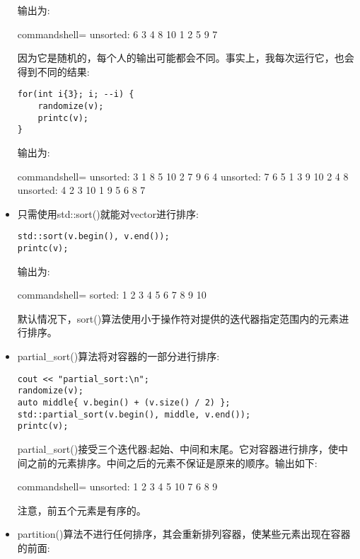 \begin{itemize}
输出为:

\begin{tcblisting}{commandshell={}}
unsorted: 6 3 4 8 10 1 2 5 9 7
\end{tcblisting}

因为它是随机的，每个人的输出可能都会不同。事实上，我每次运行它，也会得到不同的结果:

\begin{lstlisting}[style=styleCXX]
for(int i{3}; i; --i) {
	randomize(v);
	printc(v);
}
\end{lstlisting}

输出为:

\begin{tcblisting}{commandshell={}}
unsorted: 3 1 8 5 10 2 7 9 6 4
unsorted: 7 6 5 1 3 9 10 2 4 8
unsorted: 4 2 3 10 1 9 5 6 8 7
\end{tcblisting}

\item 
只需使用std::sort()就能对vector进行排序:

\begin{lstlisting}[style=styleCXX]
std::sort(v.begin(), v.end());
printc(v);
\end{lstlisting}

输出为:

\begin{tcblisting}{commandshell={}}
sorted: 1 2 3 4 5 6 7 8 9 10
\end{tcblisting}

默认情况下，sort()算法使用小于操作符对提供的迭代器指定范围内的元素进行排序。

\item 
partial\_sort()算法将对容器的一部分进行排序:

\begin{lstlisting}[style=styleCXX]
cout << "partial_sort:\n";
randomize(v);
auto middle{ v.begin() + (v.size() / 2) };
std::partial_sort(v.begin(), middle, v.end());
printc(v);
\end{lstlisting}

partial\_sort()接受三个迭代器:起始、中间和末尾。它对容器进行排序，使中间之前的元素排序。中间之后的元素不保证是原来的顺序。输出如下:

\begin{tcblisting}{commandshell={}}
unsorted: 1 2 3 4 5 10 7 6 8 9
\end{tcblisting}

注意，前五个元素是有序的。

\item 
partition()算法不进行任何排序，其会重新排列容器，使某些元素出现在容器的前面:


\end{itemize}
